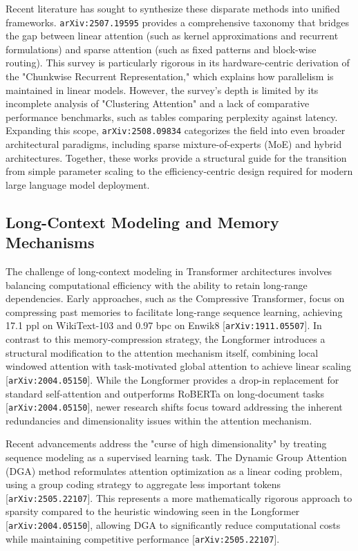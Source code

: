 \documentclass[11pt]{article}
\begin{document}
Recent literature has sought to synthesize these disparate methods into unified frameworks. \texttt{arXiv:2507.19595} provides a comprehensive taxonomy that bridges the gap between linear attention (such as kernel approximations and recurrent formulations) and sparse attention (such as fixed patterns and block-wise routing). This survey is particularly rigorous in its hardware-centric derivation of the "Chunkwise Recurrent Representation," which explains how parallelism is maintained in linear models. However, the survey's depth is limited by its incomplete analysis of "Clustering Attention" and a lack of comparative performance benchmarks, such as tables comparing perplexity against latency. Expanding this scope, \texttt{arXiv:2508.09834} categorizes the field into even broader architectural paradigms, including sparse mixture-of-experts (MoE) and hybrid architectures. Together, these works provide a structural guide for the transition from simple parameter scaling to the efficiency-centric design required for modern large language model deployment.

\subsection{Long-Context Modeling and Memory Mechanisms}

The challenge of long-context modeling in Transformer architectures involves balancing computational efficiency with the ability to retain long-range dependencies. Early approaches, such as the Compressive Transformer, focus on compressing past memories to facilitate long-range sequence learning, achieving 17.1 ppl on WikiText-103 and 0.97 bpc on Enwik8 [\texttt{arXiv:1911.05507}]. In contrast to this memory-compression strategy, the Longformer introduces a structural modification to the attention mechanism itself, combining local windowed attention with task-motivated global attention to achieve linear scaling [\texttt{arXiv:2004.05150}]. While the Longformer provides a drop-in replacement for standard self-attention and outperforms RoBERTa on long-document tasks [\texttt{arXiv:2004.05150}], newer research shifts focus toward addressing the inherent redundancies and dimensionality issues within the attention mechanism.

Recent advancements address the "curse of high dimensionality" by treating sequence modeling as a supervised learning task. The Dynamic Group Attention (DGA) method reformulates attention optimization as a linear coding problem, using a group coding strategy to aggregate less important tokens [\texttt{arXiv:2505.22107}]. This represents a more mathematically rigorous approach to sparsity compared to the heuristic windowing seen in the Longformer [\texttt{arXiv:2004.05150}], allowing DGA to significantly reduce computational costs while maintaining competitive performance [\texttt{arXiv:2505.22107}].
\end{document}
